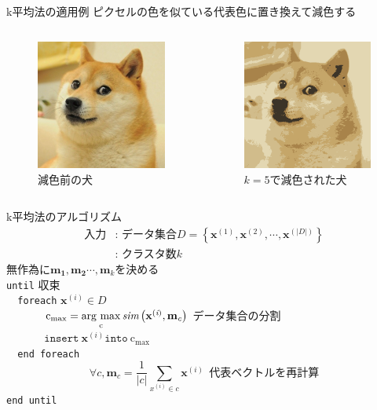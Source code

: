 \documentclass[dvipdfmx,platex]{beamer}
\newcommand{\argmax}{\mathop{\rm arg~max}\limits}
\begin{document}
\begin{frame}{k平均法の適用例}
  ピクセルの色を似ている代表色に置き換えて減色する
    \begin{columns}[T,onlytextwidth]
    \begin{figure}
      \centering
      \includegraphics[width=5cm]{fig/doge.png}
      \caption{{\mgfamily 減色前の犬}}
    \end{figure}
    \begin{figure}
      \centering
      \includegraphics[width=5cm]{fig/doge_q.png}
      \caption{$k=5${\mgfamily で減色された犬}}
    \end{figure}
  \end{columns}
\end{frame}
\begin{frame}{k平均法のアルゴリズム}
  \begin{align*}
    \text{入力}&\text{: データ集合}D=\left\{\mathbf{x}^{(1)},\mathbf{x}^{(2)},\cdots,\mathbf{x}^{(|D|)} \right\}\\
   &\text{: クラスタ数}k
  \end{align*}  
  無作為に$\mathbf{m_1}, \mathbf{m_2}\cdots,\mathbf{m_{\textit{k}}}$を決める\\
\texttt{until} 収束\\
\texttt{\ \ foreach} $\mathbf{x^{(\textit{i})}}\in D$\\
\textbf{\ \ \ \ \ \ }$\textrm{c}_{\textrm{max}} = \argmax_{\textrm{c}} \textit{\textrm{sim}}\left(\mathbf{x}^{(\textit{i})},\textbf{m}_{\textit{c}}\right)$ データ集合の分割\\
\textbf{\ \ \ \ \ \ }$\texttt{insert}\ \mathbf{x}^{(\textit{i})}\texttt{into}\ \textrm{c}_{\textrm{max}}$\\
\texttt{\ \ end\ foreach}
\[
\forall \textit{c}, \mathbf{m}_{\textit{c}}=\frac{1}{|\textit{c}|}\sum_{\textit{x}^{(i)}\in \textit{c}}\mathbf{x}^{(\textit{i})}\ \ \text{代表ベクトルを再計算}
\]
\texttt{end until}
\end{frame}
\end{document}
